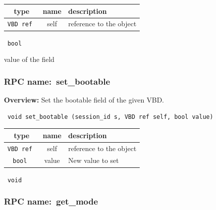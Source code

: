  
\vspace{0.3cm}
\begin{tabular}{|c|c|p{7cm}|}
 \hline
{\bf type} & {\bf name} & {\bf description} \\ \hline
{\tt VBD ref } & self & reference to the object \\ \hline 

\end{tabular}

\vspace{0.3cm}

{\tt 
bool
}


value of the field
\vspace{0.3cm}
\vspace{0.3cm}
\vspace{0.3cm}
\subsubsection{RPC name:~set\_bootable}

{\bf Overview:} 
Set the bootable field of the given VBD.

\begin{verbatim} void set_bootable (session_id s, VBD ref self, bool value)\end{verbatim}



 
\vspace{0.3cm}
\begin{tabular}{|c|c|p{7cm}|}
 \hline
{\bf type} & {\bf name} & {\bf description} \\ \hline
{\tt VBD ref } & self & reference to the object \\ \hline 

{\tt bool } & value & New value to set \\ \hline 

\end{tabular}

\vspace{0.3cm}

{\tt 
void
}



\vspace{0.3cm}
\vspace{0.3cm}
\vspace{0.3cm}
\subsubsection{RPC name:~get\_mode}

